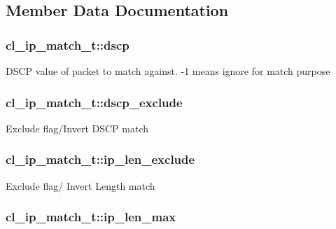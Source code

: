 \subsection{Member Data Documentation}
\hypertarget{structcl__ip__match__t_a247b29f7d57aa14541706a62956b59bd}{
\subsubsection[{dscp}]{ cl\-\_\-ip\-\_\-match\-\_\-t\-::dscp}}\label{structcl__ip__match__t_a247b29f7d57aa14541706a62956b59bd}
D\-S\-C\-P value of packet to match against. -\/1 means ignore for match purpose \hypertarget{structcl__ip__match__t_a6b4e31b2beef845d8b44101df073c41b}{
\subsubsection[{dscp\-\_\-exclude}]{ cl\-\_\-ip\-\_\-match\-\_\-t\-::dscp\-\_\-exclude}}\label{structcl__ip__match__t_a6b4e31b2beef845d8b44101df073c41b}
Exclude flag/\-Invert D\-S\-C\-P match \hypertarget{structcl__ip__match__t_af364a011fad74c921876d09c9a90ab0e}{
\subsubsection[{ip\-\_\-len\-\_\-exclude}]{ cl\-\_\-ip\-\_\-match\-\_\-t\-::ip\-\_\-len\-\_\-exclude}}\label{structcl__ip__match__t_af364a011fad74c921876d09c9a90ab0e}
Exclude flag/ Invert Length match \hypertarget{structcl__ip__match__t_a9e6b353f8e7197418b45fc8919274fd1}{
\subsubsection[{ip\-\_\-len\-\_\-max}]{ cl\-\_\-ip\-\_\-match\-\_\-t\-::ip\-\_\-len\-\_\-max}}\label{structcl__ip__match__t_a9e6b353f8e7197418b45fc8919274fd1}
